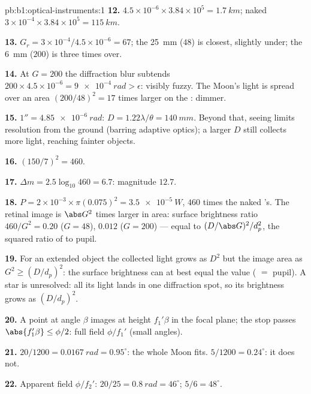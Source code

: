 \begin{solution}{pb:b1:optical-instruments:1}
\textbf{12.} $4.5\times10^{-6} \times 3.84\times10^5 = \qty{1.7}{km}$;
naked  $3\times10^{-4} \times 3.84\times10^5 = \qty{115}{km}$.

\textbf{13.} $G_r = 3\times10^{-4}/4.5\times10^{-6} = 67$; the \qty{25}{mm}
 ($48$) is closest, slightly under; the \qty{6}{mm} ($200$) is
three times over.

\textbf{14.} At $G = 200$ the diffraction blur subtends $200 \times 4.5
\times10^{-6} = \qty{9e-4}{rad} > \epsilon$: visibly fuzzy. The Moon's
light is spread over an area $(200/48)^2 = 17$ times larger on the
: dimmer.

\textbf{15.} $1'' = \qty{4.85e-6}{rad}$: $D = 1.22\lambda/\theta =
\qty{140}{mm}$. Beyond that, seeing limits resolution from the ground
(barring adaptive optics); a larger $D$ still collects more light,
reaching fainter objects.

\textbf{16.} $(150/7)^2 = 460$.

\textbf{17.} $\Delta m = 2.5\log_{10}460 = 6.7$: magnitude $12.7$.

\textbf{18.} $P = 2\times10^{-3} \times \pi(0.075)^2 = \qty{3.5e-5}{W}$,
$460$ times the naked 's. The retinal image is $\abs G^2$ times
larger in area: surface brightness ratio $460/G^2 = 0.20$ ($G = 48$),
$0.012$ ($G = 200$) --- equal to $(D/\abs G)^2/d_p^2$, the squared ratio
of  to  pupil.

\textbf{19.} For an extended object the collected light grows as $D^2$
but the image area as $G^2 \geq (D/d_p)^2$: the surface brightness can
at best equal the  value ( $=$  pupil). A star is
unresolved: all its light lands in one diffraction spot, so its
brightness grows as $(D/d_p)^2$.

\textbf{20.} A point at angle $\beta$ images at height $f_1'\beta$ in
the focal plane; the stop passes $\abs{f_1'\beta} \leq \phi/2$: full
field $\phi/f_1'$ (small angles).

\textbf{21.} $20/1200 = \qty{0.0167}{rad} = 0.95^\circ$: the whole Moon
fits. $5/1200 = 0.24^\circ$: it does not.

\textbf{22.} Apparent field $\phi/f_2'$: $20/25 = \qty{0.8}{rad} = 46^\circ$;
$5/6 = 48^\circ$.


\end{solution}

